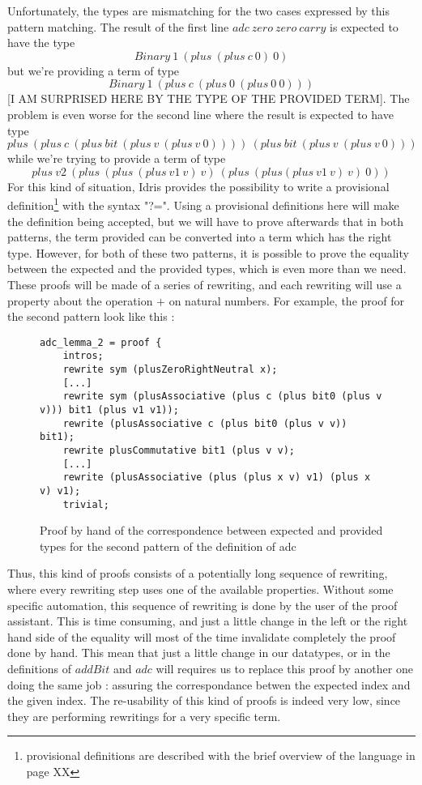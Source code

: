 Unfortunately, the types are mismatching for the two cases expressed by this pattern matching. The result of the first line $adc\ zero\ zero\ carry$ is expected to have the type\[Binary\ 1\ (plus\ (plus\ c\ 0)\ 0)\] but we're providing a term of type \[Binary\ 1\ (plus\ c\ (plus\ 0\ (plus\ 0\ 0)))\] [I AM SURPRISED HERE BY THE TYPE OF THE PROVIDED TERM].
The problem is even worse for the second line where the result is expected to have type \[plus\ (plus\ c\ (plus\ bit\ (plus\ v\ (plus\ v\ 0))))\ (plus\ bit\ (plus\ v\ (plus\ v\ 0)))\] while we're trying to provide a term of type \[plus\ v2\ (plus\ (plus\ (plus\ v1\ v)\ v)\ (plus\ (plus (plus\ v1\ v)\ v)\ 0))\]
For this kind of situation, Idris provides the possibility to write a provisional definition\footnote{provisional definitions are described with the brief overview of the language in page XX} with the syntax "?=". Using a provisional definitions here will make the definition being accepted, but we will have to prove afterwards that in both patterns, the term provided can be converted into a term which has the right type.
However, for both of these two patterns, it is possible to prove the equality between the expected and the provided types, which is even more than we need. These proofs will be made of a series of rewriting, and each rewriting will use a property about the operation $+$ on natural numbers.
For example, the proof for the second pattern look like this :
\begin{figure}[H]
\figrule
\begin{center}
\begin{verbatim}
adc_lemma_2 = proof {
    intros;
    rewrite sym (plusZeroRightNeutral x);
    [...]
    rewrite sym (plusAssociative (plus c (plus bit0 (plus v v))) bit1 (plus v1 v1));
    rewrite (plusAssociative c (plus bit0 (plus v v)) bit1);
    rewrite plusCommutative bit1 (plus v v);
    [...]
    rewrite (plusAssociative (plus (plus x v) v1) (plus x v) v1);
    trivial;
\end{verbatim}
\end{center}
\caption{Proof by hand of the correspondence between expected and provided types for the second pattern of the definition of adc}
\figrule
\end{figure}


Thus, this kind of proofs consists of a potentially long sequence of rewriting, where every rewriting step uses one of the available properties. Without some specific automation, this sequence of rewriting is done by the user of the proof assistant. This is time consuming, and just a little change in the left or the right hand side of the equality will most of the time invalidate completely the proof done by hand. This mean that just a little change in our datatypes, or in the definitions of $addBit$ and $adc$ will requires us to replace this proof by another one doing the same job : assuring the correspondance betwen the expected index and the given index. The re-usability of this kind of proofs is indeed very low, since they are performing rewritings for a very specific term.

